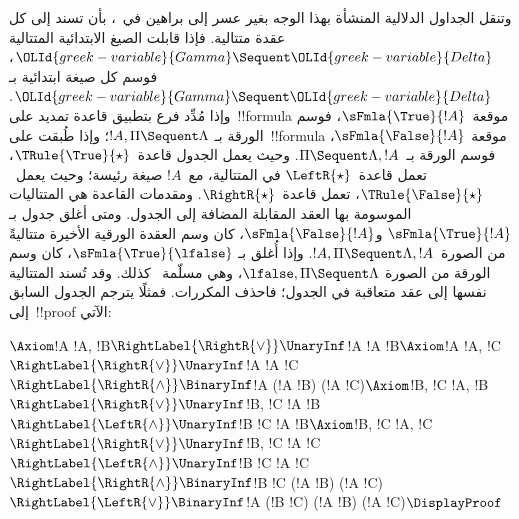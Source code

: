 \documentclass[../../../include/open-logic-section]{subfiles}
\begin{document}
وتنقل الجداول الدلالية المنشأة بهذا الوجه بغير عسر إلى براهين في~،
بأن تسند إلى كل عقدة متتالية. فإذا قابلت الصيغ الابتدائية المتتالية
$\OLId{greek-variable}{Gamma}\Sequent\OLId{greek-variable}{Delta}$، فوسم كل صيغة ابتدائية بـ
$\OLId{greek-variable}{Gamma}\Sequent\OLId{greek-variable}{Delta}$. وإذا مُدِّد فرع بتطبيق قاعدة تمديد على~!!{formula}
موقعة~$\sFmla{\True}{!A}$، فوسم الورقة بـ
$!A,\Pi\Sequent\Lambda$؛ وإذا طُبقت على~!!{formula} موقعة
$\sFmla{\False}{!A}$، فوسم الورقة بـ~$\Pi\Sequent\Lambda,!A$. وحيث يعمل
الجدول قاعدة~$\TRule{\True}{\star}$، تعمل قاعدة~$\LeftR{\star}$ في
المتتالية، مع~$!A$ صيغة رئيسة؛ وحيث يعمل~$\TRule{\False}{\star}$، تعمل
قاعدة~$\RightR{\star}$. ومقدمات القاعدة هي المتتاليات الموسومة بها العقد
المقابلة المضافة إلى الجدول. ومتى أغلق جدول بـ
$\sFmla{\True}{!A}$ و$\sFmla{\False}{!A}$، كان وسم العقدة الورقية الأخيرة
متتاليةً من الصورة~$!A,\Pi\Sequent\Lambda,!A$. وإذا أُغلق بـ
$\sFmla{\True}{\lfalse}$، كان وسم الورقة من الصورة
$\lfalse,\Pi\Sequent\Lambda$، وهي مسلّمة~ كذلك. وقد تُسند
المتتالية نفسها إلى عقد متعاقبة في الجدول؛ فاحذف المكررات. فمثلًا يترجم
الجدول السابق إلى~!!{proof} الآتي:
\begin{maxwidth}
$
\Axiom$!A \fCenter !A, !B$
\RightLabel{\RightR{\lor}}
\UnaryInf$!A \fCenter !A \lor !B$
\Axiom$!A \fCenter !A, !C$
\RightLabel{\RightR{\lor}}
\UnaryInf$!A \fCenter !A \lor !C$
\RightLabel{\RightR{\land}}
\BinaryInf$!A \fCenter (!A \lor !B) \land (!A \lor !C)$
\Axiom$!B, !C \fCenter !A, !B$
\RightLabel{\RightR{\lor}}
\UnaryInf$!B, !C \fCenter !A \lor !B$
\RightLabel{\LeftR{\land}}
\UnaryInf$!B \land !C \fCenter !A \lor !B$
\Axiom$!B, !C \fCenter !A, !C$
\RightLabel{\RightR{\lor}}
\UnaryInf$!B, !C \fCenter !A \lor !C$
\RightLabel{\LeftR{\land}}
\UnaryInf$!B \land !C \fCenter !A \lor !C$
\RightLabel{\RightR{\land}}
\BinaryInf$!B \land !C \fCenter (!A \lor !B) \land
(!A \lor !C)$
\RightLabel{\LeftR{\lor}}
\BinaryInf$!A \lor (!B \land !C) \fCenter (!A \lor !B) \land
(!A \lor !C)$
\DisplayProof$
\end{maxwidth}
\end{document}
